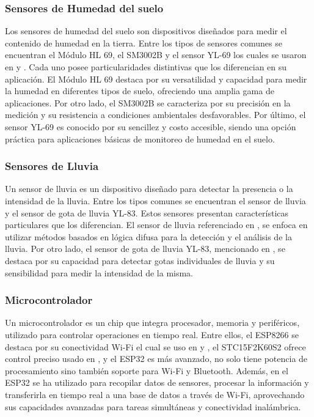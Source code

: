 \subsubsection*{Sensores de Humedad del suelo}
Los sensores de humedad del suelo son dispositivos diseñados para medir el contenido de humedad en la tierra. Entre los tipos de sensores comunes se encuentran el Módulo HL 69, el SM3002B y el sensor YL-69 los cuales se usaron en \cite{alcivar_dominguez_sistema_2018} \cite{haiyan_intelligent_2022} y \cite{haiyan_intelligent_2022}. Cada uno posee particularidades distintivas que los diferencian en su aplicación. El Módulo HL 69 destaca por su versatilidad y capacidad para medir la humedad en diferentes tipos de suelo, ofreciendo una amplia gama de aplicaciones. Por otro lado, el SM3002B se caracteriza por su precisión en la medición y su resistencia a condiciones ambientales desfavorables. Por último, el sensor YL-69 es conocido por su sencillez y costo accesible, siendo una opción práctica para aplicaciones básicas de monitoreo de humedad en el suelo.

\subsubsection*{Sensores de Lluvia}
Un sensor de lluvia es un dispositivo diseñado para detectar la presencia o la intensidad de la lluvia. Entre los tipos comunes se encuentran el sensor de lluvia y el sensor de gota de lluvia YL-83. Estos sensores presentan características particulares que los diferencian. El sensor de lluvia referenciado en \cite{krishnan_fuzzy_2020}, se enfoca en utilizar métodos basados en lógica difusa para la detección y el análisis de la lluvia. Por otro lado, el sensor de gota de lluvia YL-83, mencionado en \cite{alcivar_dominguez_sistema_2018}, se destaca por su capacidad para detectar gotas individuales de lluvia y su sensibilidad para medir la intensidad de la misma.

\subsubsection{Microcontrolador}
Un microcontrolador es un chip que integra procesador, memoria y periféricos, utilizado para controlar operaciones en tiempo real. Entre ellos, el ESP8266 se destaca por su conectividad Wi-Fi el cual se uso en \cite{hasan_implementation_2018} y \cite{widyawati_fuzzy_2022}, el STC15F2K60S2 ofrece control preciso usado en \cite{haiyan_intelligent_2022}, y el ESP32 es más avanzado, no solo tiene potencia de procesamiento sino también soporte para Wi-Fi y Bluetooth. Además, en \cite{ramos_galindo_diseno_2023} el ESP32 se ha utilizado para recopilar datos de sensores, procesar la información y transferirla en tiempo real a una base de datos a través de Wi-Fi, aprovechando sus capacidades avanzadas para tareas simultáneas y conectividad inalámbrica.

